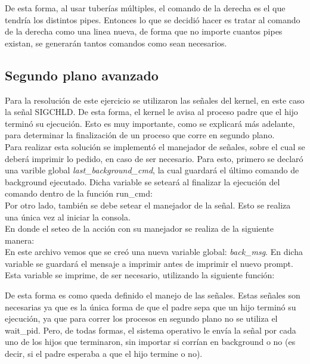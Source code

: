 \documentclass[a4paper, 12pt]{article}
\begin{document}
		De esta forma, al usar tuberías múltiples, el comando de la derecha es el que tendría los distintos pipes. Entonces lo que se decidió hacer es tratar al comando de la derecha como una linea nueva, de forma que no importe cuantos pipes existan, se generarán tantos comandos como sean necesarios.
		
		
		\subsection{Segundo plano avanzado}
		Para la resolución de este ejercicio se utilizaron las señales del kernel, en este caso la señal SIGCHLD. De esta forma, el kernel le avisa al proceso padre que el hijo terminó su ejecución. Esto es muy importante, como se explicará más adelante, para determinar la finalización de un proceso que corre en segundo plano.\\
		
		Para realizar esta solución se implementó el manejador de señales, sobre el cual se deberá imprimir lo pedido, en caso de ser necesario. Para esto, primero se declaró una varible global \textit{last\_background\_cmd}, la cual guardará el último comando de background ejecutado. Dicha variable se seteará al finalizar la ejecución del comando dentro de la función run\_cmd:\\
		
		
		Por otro lado, también se debe setear el manejador de la señal. Esto se realiza una única vez al iniciar la consola.\\
		
		
		En donde el seteo de la acción con su manejador se realiza de la siguiente manera:\\
		
		
		En este archivo vemos que se creó una nueva variable global: \textit{back\_msg}. En dicha variable se guardará el mensaje a imprimir antes de imprimir el nuevo prompt. Esta variable se imprime, de ser necesario, utilizando la siguiente función:
		
		
		De esta forma es como queda definido el manejo de las señales. Estas señales son necesarias ya que es la única forma de que el padre sepa que un hijo terminó su ejecución, ya que para correr los procesos en segundo plano no se utiliza el wait\_pid. Pero, de todas formas, el sistema operativo le envía la señal por cada uno de los hijos que terminaron, sin importar si corrían en background o no (es decir, si el padre esperaba a que el hijo termine o no).\\
		
\end{document}
